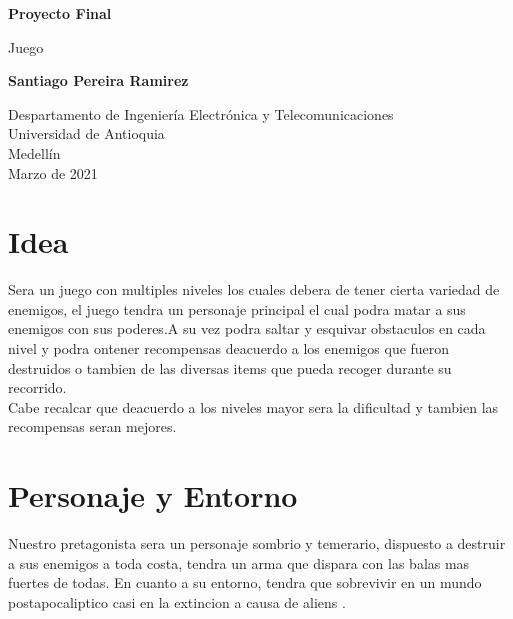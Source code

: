 \documentclass{article}
\begin{document}
\begin{titlepage}
    \begin{center}
        \vspace*{1cm}
            
        \Huge
        \textbf{Proyecto Final}
            
        \vspace{0.5cm}
        \LARGE
       Juego
            
        \vspace{1.5cm}
            
        \textbf{Santiago Pereira Ramirez}
            
        \vfill
            
        \vspace{0.8cm}
            
        \Large
        Despartamento de Ingeniería Electrónica y Telecomunicaciones\\
        Universidad de Antioquia\\
        Medellín\\
        Marzo de 2021
            
    \end{center}
\end{titlepage}

\tableofcontents


\section{Idea} \label{contenido}

Sera un juego con multiples niveles los cuales debera de tener cierta variedad de enemigos, el juego tendra un personaje principal el cual podra matar a sus enemigos con sus poderes.A su vez podra saltar y esquivar obstaculos en cada nivel y podra ontener recompensas deacuerdo a los enemigos que fueron destruidos o tambien de las diversas items que pueda recoger durante su recorrido.\\

Cabe recalcar que deacuerdo a los niveles mayor sera la dificultad y tambien las recompensas seran mejores.\\

\section{Personaje y Entorno} \label{conclulsion}

Nuestro pretagonista sera un personaje sombrio y temerario, dispuesto a destruir a sus enemigos a toda costa, tendra un arma que dispara con las balas mas fuertes de todas. En cuanto a su entorno, tendra que sobrevivir en un mundo postapocaliptico casi en la extincion a causa de aliens .
\end{document}
